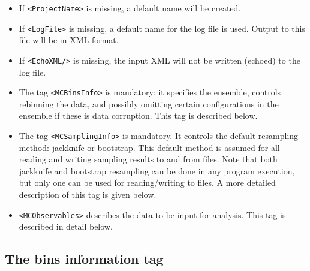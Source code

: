 \documentclass[12pt]{article}
\newcommand{\vb}{\texttt}
\begin{document}
\begin{itemize} 
\item                                                 
 If \vb{<ProjectName>} is missing, a default name will be created.
\item                                                                   
 If \vb{<LogFile>} is missing, a default name for the log file is used. 
Output to this file will be in XML format.
\item                                                              
 If \vb{<EchoXML/>} is missing, the input XML will not be written (echoed)
 to the log file. 
\item                                                                   
 The tag \vb{<MCBinsInfo>} is mandatory: it specifies the ensemble,
 controls rebinning the data, and possibly omitting certain configurations 
 in the ensemble if these is data corruption.  This tag is described below.                                                      
\item                                                                   
 The tag \vb{<MCSamplingInfo>} is mandatory.  It controls the default
 resampling method:  jackknife or bootstrap.  This default method
 is assumed for all reading and writing sampling results to and
 from files.  Note that both jackknife and bootstrap resampling
 can be done in any program execution, but only one can be used 
 for reading/writing to files.  A more detailed 
 description of this tag is given below.    
\item                                                                   
 \vb{<MCObservables>} describes the data to be input for analysis. This
 tag is described in detail below.       
\end{itemize}                                                                    

\subsection{The bins information tag}
\end{document}
